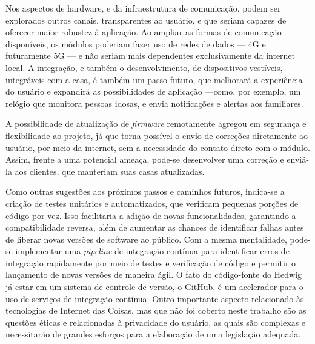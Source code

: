 Nos aspectos de hardware, e da infraestrutura de comunicação, podem ser explorados outros canais, transparentes ao usuário, e que seriam capazes de oferecer maior robustez à aplicação. Ao ampliar as formas de comunicação disponíveis, os módulos poderiam fazer uso de redes de dados --- 4G e futuramente 5G --- e não seriam mais dependentes exclusivamente da internet local. A integração, e também o desenvolvimento, de dispositivos vestíveis, integráveis com a casa, é também um passo futuro, que melhorará a experiência do usuário e expandirá as possibilidades de aplicação ---como, por exemplo, um relógio que monitora pessoas idosas, e envia notificações e alertas aos familiares.

A possibilidade de atualização de \textit{firmware} remotamente agregou em segurança e flexibilidade ao projeto, já que torna possível o envio de correções diretamente ao usuário, por meio da internet, sem a necessidade do contato direto com o módulo. Assim, frente a uma potencial ameaça, pode-se desenvolver uma correção e enviá-la aos clientes, que manteriam suas casas atualizadas.

Como outras sugestões aos próximos passos e caminhos futuros, indica-se a criação de testes unitários e automatizados, que verificam pequenas porções de código por vez. Isso facilitaria a adição de novas funcionalidades, garantindo a compatibilidade reversa, além de aumentar as chances de identificar falhas antes de liberar novas versões de software ao público. Com a mesma mentalidade, pode-se implementar uma \textit{pipeline} de integração contínua para identificar erros de integração rapidamente por meio de testes e verificação de código e permitir o lançamento de novas versões de maneira ágil. O fato do código-fonte do Hedwig já estar em um sistema de controle de versão, o GitHub, é um acelerador para o uso de serviços de integração contínua. Outro importante aspecto relacionado às tecnologias de Internet das Coisas, mas que não foi coberto neste trabalho são as questões éticas e relacionadas à privacidade do usuário, as quais são complexas e necessitarão de grandes esforços para a elaboração de uma legislação adequada.
